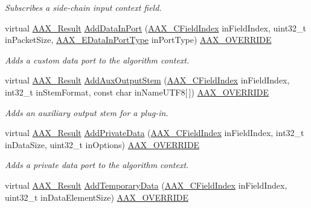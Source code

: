 \begin{DoxyCompactItemize}
\begin{DoxyCompactList}\small\item\em Subscribes a side-\/chain input context field. \end{DoxyCompactList}\item 
virtual \hyperlink{a00149_a4d8f69a697df7f70c3a8e9b8ee130d2f}{A\+A\+X\+\_\+\+Result} \hyperlink{a00131_a76ab9a0bef4cd6b6aa7144ed1adbe8a3}{Add\+Data\+In\+Port} (\hyperlink{a00149_ae807f8986143820cfb5d6da32165c9c7}{A\+A\+X\+\_\+\+C\+Field\+Index} in\+Field\+Index, uint32\+\_\+t in\+Packet\+Size, \hyperlink{a00206_ab5677b173ad8647c24d34d28272d11fc}{A\+A\+X\+\_\+\+E\+Data\+In\+Port\+Type} in\+Port\+Type) \hyperlink{a00149_ac2f24a5172689ae684344abdcce55463}{A\+A\+X\+\_\+\+O\+V\+E\+R\+R\+I\+D\+E}
\begin{DoxyCompactList}\small\item\em Adds a custom data port to the algorithm context. \end{DoxyCompactList}\item 
virtual \hyperlink{a00149_a4d8f69a697df7f70c3a8e9b8ee130d2f}{A\+A\+X\+\_\+\+Result} \hyperlink{a00131_af9da81420804b74190f5e60ecdfbdbad}{Add\+Aux\+Output\+Stem} (\hyperlink{a00149_ae807f8986143820cfb5d6da32165c9c7}{A\+A\+X\+\_\+\+C\+Field\+Index} in\+Field\+Index, int32\+\_\+t in\+Stem\+Format, const char in\+Name\+U\+T\+F8\mbox{[}$\,$\mbox{]}) \hyperlink{a00149_ac2f24a5172689ae684344abdcce55463}{A\+A\+X\+\_\+\+O\+V\+E\+R\+R\+I\+D\+E}
\begin{DoxyCompactList}\small\item\em Adds an auxiliary output stem for a plug-\/in. \end{DoxyCompactList}\item 
virtual \hyperlink{a00149_a4d8f69a697df7f70c3a8e9b8ee130d2f}{A\+A\+X\+\_\+\+Result} \hyperlink{a00131_a57d31bbc438a1472a9811df478fe771b}{Add\+Private\+Data} (\hyperlink{a00149_ae807f8986143820cfb5d6da32165c9c7}{A\+A\+X\+\_\+\+C\+Field\+Index} in\+Field\+Index, int32\+\_\+t in\+Data\+Size, uint32\+\_\+t in\+Options) \hyperlink{a00149_ac2f24a5172689ae684344abdcce55463}{A\+A\+X\+\_\+\+O\+V\+E\+R\+R\+I\+D\+E}
\begin{DoxyCompactList}\small\item\em Adds a private data port to the algorithm context. \end{DoxyCompactList}\item 
virtual \hyperlink{a00149_a4d8f69a697df7f70c3a8e9b8ee130d2f}{A\+A\+X\+\_\+\+Result} \hyperlink{a00131_adcdfdf13217a7df7f323457c18bdcc3e}{Add\+Temporary\+Data} (\hyperlink{a00149_ae807f8986143820cfb5d6da32165c9c7}{A\+A\+X\+\_\+\+C\+Field\+Index} in\+Field\+Index, uint32\+\_\+t in\+Data\+Element\+Size) \hyperlink{a00149_ac2f24a5172689ae684344abdcce55463}{A\+A\+X\+\_\+\+O\+V\+E\+R\+R\+I\+D\+E}

\end{DoxyCompactItemize}
